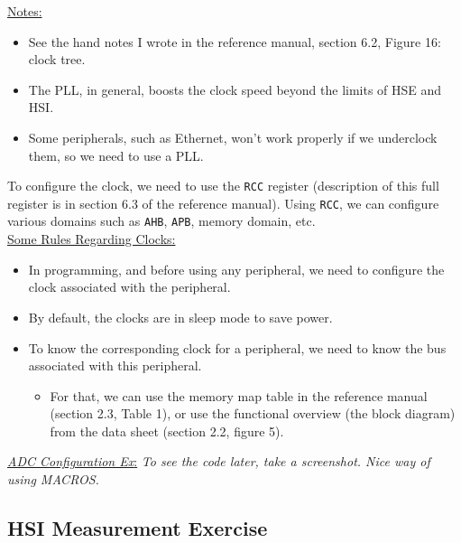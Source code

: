 \underline{Notes:}

\begin{itemize}
    \item See the hand notes I wrote in the reference manual, section 6.2, Figure 16: clock tree.

    \item The PLL, in general, boosts the clock speed beyond the limits of HSE and HSI.

    \item Some peripherals, such as Ethernet, won't work properly if we underclock them, so we need to use a PLL.
\end{itemize}

To configure the clock, we need to use the \verb|RCC| register (description of this full register is in section 6.3 of the reference manual). Using \verb|RCC|, we can configure various domains such as \verb|AHB|, \verb|APB|, memory domain, etc.\\

\underline{Some Rules Regarding Clocks:}

\begin{itemize}
    
    \item In programming, and before using any peripheral, we need to configure the clock associated with the peripheral.

    \item By default, the clocks are in sleep mode to save power.

    \item To know the corresponding clock for a peripheral, we need to know the bus associated with this peripheral.

    \begin{itemize}
        \item For that, we can use the memory map table in the reference manual (section 2.3, Table 1), or use the functional overview (the block diagram) from the data sheet (section 2.2, figure 5).
    \end{itemize}
    
\end{itemize}

 \underline{\textit{ADC Configuration Ex}:} \textit{To see the code later, take a screenshot. Nice way of using MACROS.}

\newpage

\subsection{HSI Measurement Exercise}

